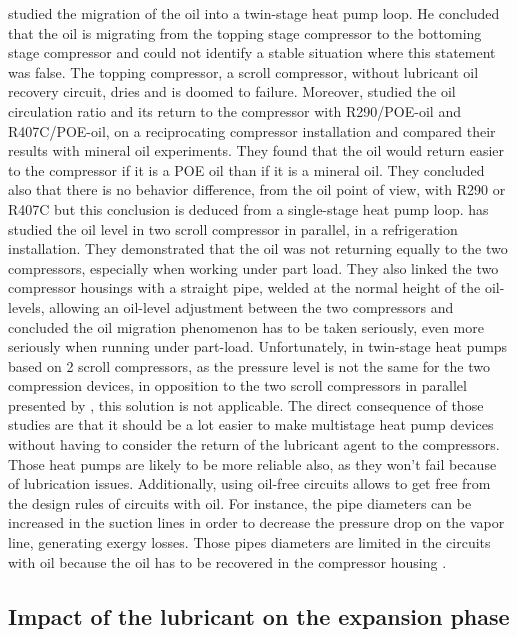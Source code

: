 \citet{Zehnder-2004a} studied the migration of the oil into a
twin-stage heat pump loop. He concluded that the oil is migrating from
the topping stage compressor to the bottoming stage compressor and
could not identify a stable situation where this statement was
false. The topping compressor, a scroll compressor, without lubricant
oil recovery circuit, dries and is doomed to failure. Moreover,
\citet{Navarro-Corberan-2005a} studied the oil circulation ratio and
its return to the compressor with R290/POE-oil and R407C/POE-oil, on a
reciprocating compressor installation and compared their results with
mineral oil experiments. They found that the oil would return easier
to the compressor if it is a POE oil than if it is a mineral oil. They
concluded also that there is no behavior difference, from the oil
point of view, with R290 or R407C but this conclusion is deduced from
a single-stage heat pump loop. \citet{Winandy-Cuevas-2003a} has
studied the oil level in two scroll compressor in parallel, in a
refrigeration installation. They demonstrated that the oil was not
returning equally to the two compressors, especially when working
under part load. They also linked the two compressor housings with a
straight pipe, welded at the normal height of the oil-levels, allowing
an oil-level adjustment between the two compressors and concluded the
oil migration phenomenon has to be taken seriously, even more
seriously when running under part-load. Unfortunately, in twin-stage
heat pumps based on 2 scroll compressors, as the pressure level is not
the same for the two compression devices, in opposition to the two
scroll compressors in parallel presented by
\citet{Winandy-Cuevas-2003a}, this solution is not applicable. The
direct consequence of those studies are that it should be a lot easier
to make multistage heat pump devices without having to consider the
return of the lubricant agent to the compressors. Those heat pumps are
likely to be more reliable also, as they won't fail because of
lubrication issues. Additionally, using oil-free circuits allows to
get free from the design rules of circuits with oil. For instance, the
pipe diameters can be increased in the suction lines in order to
decrease the pressure drop on the vapor line, generating exergy
losses. Those pipes diameters are limited
in the circuits with oil because the oil has to be recovered in the
compressor housing \citep{kesim-ileri-2000a,Guo-Shen-2011a}.

\subsection{Impact of the lubricant on the expansion phase}
\label{sec:oil-dv}

